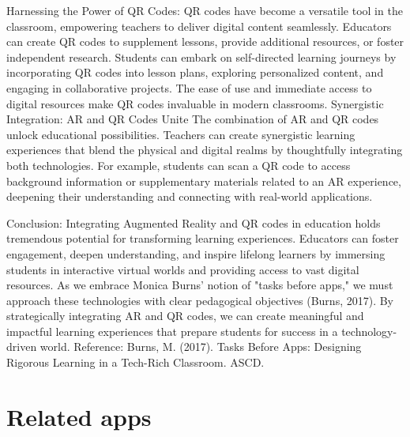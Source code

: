 Harnessing the Power of QR Codes: QR codes have become a versatile tool in the classroom, empowering teachers to deliver digital content seamlessly. Educators can create QR codes to supplement lessons, provide additional resources, or foster independent research. Students can embark on self-directed learning journeys by incorporating QR codes into lesson plans, exploring personalized content, and engaging in collaborative projects. The ease of use and immediate access to digital resources make QR codes invaluable in modern classrooms.
Synergistic Integration: AR and QR Codes Unite The combination of AR and QR codes unlock educational possibilities. Teachers can create synergistic learning experiences that blend the physical and digital realms by thoughtfully integrating both technologies. For example, students can scan a QR code to access background information or supplementary materials related to an AR experience, deepening their understanding and connecting with real-world applications.

Conclusion: Integrating Augmented Reality and QR codes in education holds tremendous potential for transforming learning experiences. Educators can foster engagement, deepen understanding, and inspire lifelong learners by immersing students in interactive virtual worlds and providing access to vast digital resources. As we embrace Monica Burns' notion of "tasks before apps," we must approach these technologies with clear pedagogical objectives (Burns, 2017). By strategically integrating AR and QR codes, we can create meaningful and impactful learning experiences that prepare students for success in a technology-driven world.
Reference: Burns, M. (2017). Tasks Before Apps: Designing Rigorous Learning in a Tech-Rich Classroom. ASCD.
\section{Related apps}

